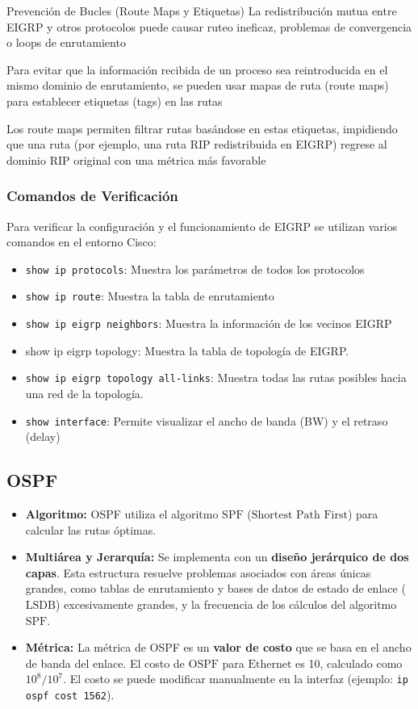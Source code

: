 \documentclass[a5paper]{book}%
\begin{document}
  Prevención de Bucles (Route Maps y Etiquetas)
  La redistribución mutua entre EIGRP y otros protocolos puede causar ruteo ineficaz, problemas de convergencia o loops de enrutamiento
  
  Para evitar que la información recibida de un proceso sea reintroducida en el mismo dominio de enrutamiento, se pueden usar mapas de ruta (route maps) para establecer etiquetas (tags) en las rutas
  
  Los route maps permiten filtrar rutas basándose en estas etiquetas, impidiendo que una ruta (por ejemplo, una ruta RIP redistribuida en EIGRP) regrese al dominio RIP original con una métrica más favorable
  
  
  \subsubsection{Comandos de Verificación}
  Para verificar la configuración y el funcionamiento de EIGRP se utilizan varios comandos en el entorno Cisco:
  
  \begin{itemize}
  	\item \texttt{show ip protocols}: Muestra los parámetros de todos los protocolos
  	\item \texttt{show ip route}: Muestra la tabla de enrutamiento
  	\item \texttt{show ip eigrp neighbors}: Muestra la información de los vecinos EIGRP
  	\item show ip eigrp topology: Muestra la tabla de topología de EIGRP.
  	\item \texttt{show ip eigrp topology all-links}: Muestra todas las rutas posibles hacia una red de la topología.
  	
  	\item \texttt{show interface}: Permite visualizar el ancho de banda (BW) y el retraso (delay)
  \end{itemize}
  
    
  
  \subsection{OSPF}
  
  \begin{itemize}
  	\item \textbf{Algoritmo:} OSPF utiliza el algoritmo $\text{SPF}$ ($\text{Shortest Path First}$) para calcular las rutas óptimas.
  	\item \textbf{Multiárea y Jerarquía:} Se implementa con un \textbf{diseño jerárquico de dos capas}. Esta estructura resuelve problemas asociados con áreas únicas grandes, como tablas de enrutamiento y bases de datos de estado de enlace ($\text{LSDB}$) excesivamente grandes, y la frecuencia de los cálculos del algoritmo $\text{SPF}$.
  	\item \textbf{Métrica:} La métrica de OSPF es un \textbf{valor de costo} que se basa en el ancho de banda del enlace. El costo de $\text{OSPF}$ para $\text{Ethernet}$ es 10, calculado como $10^8/10^7$. El costo se puede modificar manualmente en la interfaz (ejemplo: \texttt{ip ospf cost 1562}).
  \end{itemize}
  
\end{document}
